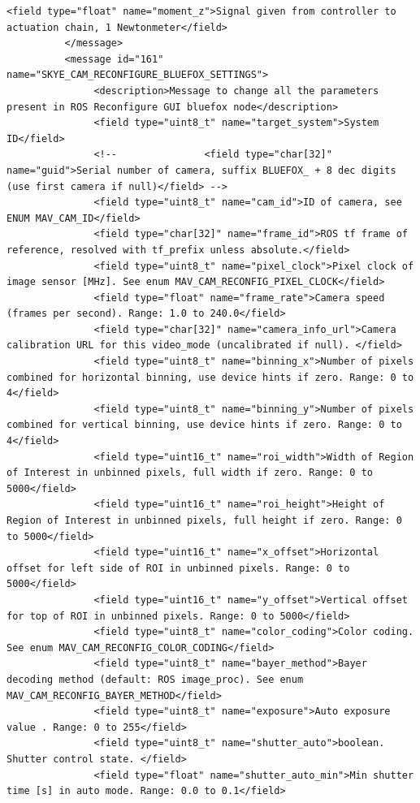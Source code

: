 \begin{lstlisting}[captionpos=b, caption="Definition of \textsc{Skye} specific Mavlink messages", label=app_xml]
               <field type="float" name="moment_z">Signal given from controller to actuation chain, 1 Newtonmeter</field>
          </message>
          <message id="161" name="SKYE_CAM_RECONFIGURE_BLUEFOX_SETTINGS">
               <description>Message to change all the parameters present in ROS Reconfigure GUI bluefox node</description>
               <field type="uint8_t" name="target_system">System ID</field>
               <!--               <field type="char[32]" name="guid">Serial number of camera, suffix BLUEFOX_ + 8 dec digits (use first camera if null)</field> -->
               <field type="uint8_t" name="cam_id">ID of camera, see ENUM MAV_CAM_ID</field>
               <field type="char[32]" name="frame_id">ROS tf frame of reference, resolved with tf_prefix unless absolute.</field>
               <field type="uint8_t" name="pixel_clock">Pixel clock of image sensor [MHz]. See enum MAV_CAM_RECONFIG_PIXEL_CLOCK</field>
               <field type="float" name="frame_rate">Camera speed (frames per second). Range: 1.0 to 240.0</field>
               <field type="char[32]" name="camera_info_url">Camera calibration URL for this video_mode (uncalibrated if null). </field>
               <field type="uint8_t" name="binning_x">Number of pixels combined for horizontal binning, use device hints if zero. Range: 0 to 4</field>
               <field type="uint8_t" name="binning_y">Number of pixels combined for vertical binning, use device hints if zero. Range: 0 to 4</field>
               <field type="uint16_t" name="roi_width">Width of Region of Interest in unbinned pixels, full width if zero. Range: 0 to 5000</field>
               <field type="uint16_t" name="roi_height">Height of Region of Interest in unbinned pixels, full height if zero. Range: 0 to 5000</field>
               <field type="uint16_t" name="x_offset">Horizontal offset for left side of ROI in unbinned pixels. Range: 0 to 5000</field>
               <field type="uint16_t" name="y_offset">Vertical offset for top of ROI in unbinned pixels. Range: 0 to 5000</field>
               <field type="uint8_t" name="color_coding">Color coding. See enum MAV_CAM_RECONFIG_COLOR_CODING</field>
               <field type="uint8_t" name="bayer_method">Bayer decoding method (default: ROS image_proc). See enum MAV_CAM_RECONFIG_BAYER_METHOD</field>
               <field type="uint8_t" name="exposure">Auto exposure value . Range: 0 to 255</field>
               <field type="uint8_t" name="shutter_auto">boolean. Shutter control state. </field>
               <field type="float" name="shutter_auto_min">Min shutter time [s] in auto mode. Range: 0.0 to 0.1</field>

\end{lstlisting}
